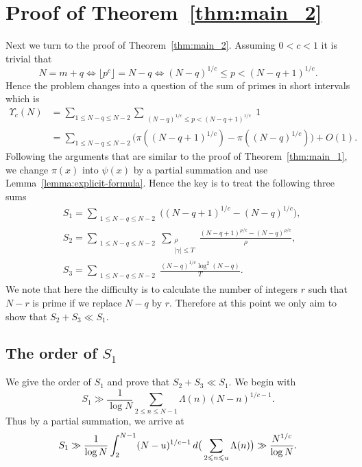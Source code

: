 \documentclass[12pt, reqno, twoside, letterpaper]{amsart}
\numberwithin{equation}{section}
\theoremstyle{customthm}
\theoremstyle{customrem}
\def\int{\intop\nolimits}
\begin{document}
\section{Proof of Theorem~\ref{thm:main_2}}
Next we turn to the proof of Theorem~\ref{thm:main_2}. Assuming $0<c<1$ it is trivial that
$$
N=m+q \Leftrightarrow \lfloor p^c \rfloor =N-q   \Leftrightarrow (N-q)^{1/c} \leqslant p <(N-q+1)^{1/c}.
$$
Hence the problem changes into a question of the sum of primes in short intervals which is 
\begin{align*}
\Upsilon_c(N) &=\sum_{1\leqslant N-q\leqslant N-2 } \sum_{\substack{ (N-q)^{1/c} \leqslant p <(N-q+1)^{1/c}}}1 \nonumber \\
	&= \sum_{1\leqslant N-q\leqslant N-2 } \big( \pi((N-q+1)^{1/c})-\pi((N-q)^{1/c}) \big)+O(1).
\end{align*}
Following the arguments that are similar to the proof of Theorem~\ref{thm:main_1}, we change $\pi(x)$ into $\psi(x)$ by a partial summation and use Lemma~\ref{lemma:explicit-formula}. Hence the key is to treat the following three sums      
\begin{align*}
	&S_1=\sum_{\substack{1\leqslant N-q\leqslant N-2 }} \bigg( (N-q+1)^{1/c}-(N-q)^{1/c} \bigg),\\
	&S_2=\sum_{\substack{1\leqslant N-q\leqslant N-2}} \sum_{\substack{\rho \\ |\gamma| \leqslant T}}\frac{(N-q+1)^{\rho/c}-(N-q)^{\rho/c}}{\rho},\\
	&S_3= \sum_{\substack{1\leqslant N-q\leqslant N-2}} \frac{(N-q)^{1/c}\log ^2(N-q)}{T}.
\end{align*}  
We note that here the difficulty is to calculate the number of integers $r$ such that $N-r$ is prime if we replace $N-q$ by $r$. Therefore at this point we only aim to show that $S_2+S_3\ll S_1$.
\subsection{The order of $S_1$} 
We give the order of $S_1$ and prove that $S_2+S_3\ll S_1$. We begin with
\begin{equation*}
S_1\gg \frac{1}{\log N}\sum_{2\leqslant n\leqslant N-1}\Lambda(n)(N-n)^{1/c-1}.
\end{equation*}
Thus by a partial summation, we arrive at
\begin{equation}
	\label{S_1}
S_1\gg \frac{1}{\log N}\int_{2}^{N-1}(N-u)^{1/c-1}\,d\big(\sum_{2\leqslant n\leqslant u}\Lambda(n) \big) \gg \frac{N^{1/c}}{\log N}.
\end{equation}
\end{document}
